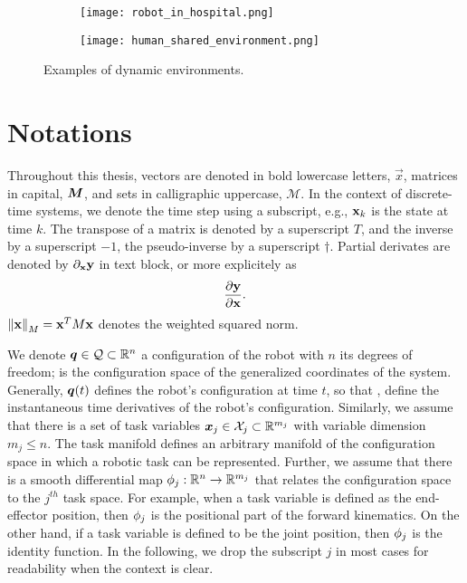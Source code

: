 \begin{figure}[ht]
  \centering
  \begin{subfigure}[b]{0.45\textwidth}
    \texttt{[image: robot\_in\_hospital.png]}
  \end{subfigure}
  \hfill
  \begin{subfigure}[b]{0.45\textwidth}
    \texttt{[image: human\_shared\_environment.png]}
  \end{subfigure}
  \caption{Examples of dynamic environments.}
  \label{fig:dynamic_environments}
\end{figure}



\section{Notations} %
\label{sec:notations}

Throughout this thesis, vectors are denoted in bold lowercase
letters, $\vec{x}$, matrices in capital, $\bm{M}$, and sets
in calligraphic uppercase, $\mathcal{M}$. In the context of
discrete-time systems, we denote the time step using a
subscript, e.g., $\mathbf{x}_k$ is the state at time $k$. The
transpose of a matrix is denoted by a superscript $T$, and
the inverse by a superscript $-1$, the pseudo-inverse by a
superscript $\dagger$. Partial derivates are denoted by 
$\partial_{\mathbf{x}}\mathbf{y}$ in text block, or more explicitely as
\[\frac{\partial\mathbf{y}}{\partial\mathbf{x}}.\]
 $\left\lVert\mathbf{x}\right\rVert_M = \mathbf{x}^TM\mathbf{x}$
denotes the weighted squared norm. 


We denote $\bm{q}\in\mathcal{Q}\subset\mathbb{R}^n$ a configuration of the robot
with $n$ its degrees of freedom; \Q{} is the configuration
space of the generalized coordinates of the system.
Generally, $\bm{q}(t)$ defines the robot's configuration at time
$t$, so that \qdot{}, \qddot{} define the instantaneous time
derivatives of the robot's configuration. Similarly, we
assume that there is a set of task variables
$\bm{x}_j\in\mathcal{X}_j\subset\mathbb{R}^{m_j}$ with variable dimension $m_j \leq n$.
The task manifold \Xj{} defines an arbitrary manifold of the
configuration space \Q{} in which a robotic task can be
represented. Further, we assume that there is a smooth differential
map $\phi_j:\mathbb{R}^n\rightarrow\mathbb{R}^{m_j}$ that relates the
configuration space to the $j^{th}$ task space. For example,
when a task variable is defined as the end-effector
position, then $\phi_j$ is the positional part of the
forward kinematics. On the other hand, if a task variable is
defined to be the joint position, then $\phi_j$ is the
identity function. In the following, we drop the subscript
$j$ in most cases for readability when the context is clear.


